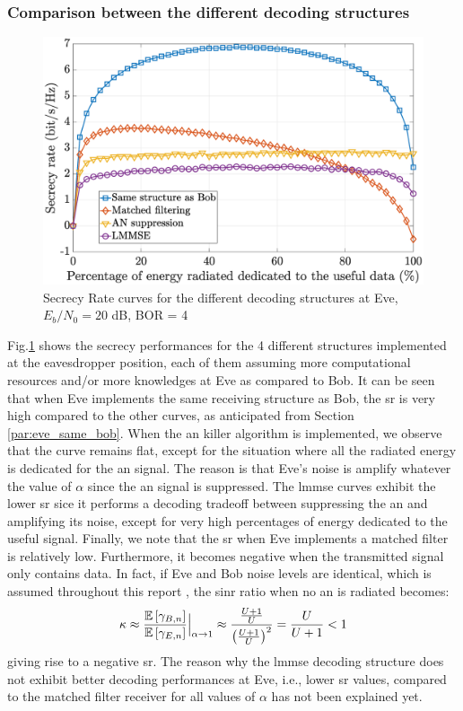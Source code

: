 \subsubsection{Comparison between the different decoding structures}
\begin{figure}[htb!]
    \centering
    \centerline{\includegraphics[width = .65\textwidth]{graphs/SR_filter_comparaison.eps}}
    \caption{Secrecy Rate curves for the different decoding structures at Eve, $E_b/N_0=20$ dB, BOR = 4 }
    \label{fig:secrecy_filt_comparaison}
\end{figure}
Fig.\ref{fig:secrecy_filt_comparaison} shows the secrecy performances for the 4 different structures implemented at the eavesdropper position, each of them assuming more computational resources and/or more knowledges at Eve as compared to Bob. It can be seen that when Eve implements the same receiving structure as Bob, the \gls{sr} is very high compared to the other curves, as anticipated from Section \ref{par:eve_same_bob}. When the \gls{an} killer algorithm is implemented, we observe that the curve remains flat, except for the situation where all the radiated energy is dedicated for the \gls{an} signal. The reason is that Eve's noise is amplify whatever the value of $\alpha$ since the \gls{an} signal is suppressed. The \gls{lmmse} curves exhibit the lower \gls{sr} sice it performs a decoding tradeoff between suppressing the \gls{an} and amplifying its noise, except for very high percentages of energy dedicated to the useful signal. Finally, we note that the \gls{sr} when Eve implements a matched filter is relatively low. Furthermore, it becomes negative when the transmitted signal only contains data. In fact, if Eve and Bob noise levels are identical, which is assumed throughout this report , the \gls{sinr} ratio when no \gls{an} is radiated becomes:
\begin{equation}
    \kappa \approx \frac{\mathbb{E} \left[\gamma_{B,n}\right]}{\mathbb{E} \left[\gamma_{E,n}\right]}\Big|_{\alpha \to 1} \approx \frac{\frac{U+1}{U}}{\left(\frac{U+1}{U}\right)^2} = \frac{U}{U+1}< 1
\end{equation}
giving rise to a negative \gls{sr}. The reason why the \gls{lmmse} decoding structure does not exhibit better decoding performances at Eve, i.e., lower \gls{sr} values, compared to the matched filter receiver for all values of $\alpha$ has not been explained yet.






